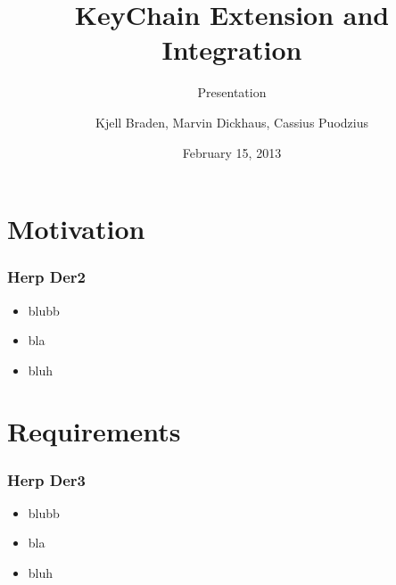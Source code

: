 \documentclass{beamer}
\title{KeyChain Extension and Integration}
\subtitle{Presentation}
\author[Braden, Dickhaus, Puodzius]{Kjell Braden, Marvin Dickhaus, Cassius Puodzius}
\institute{Fachbereich Informatik \\ TU Darmstadt}
\date{February 15, 2013}
\begin{document}
\begin{frame}
	\titlepage
\end{frame}
\begin{frame}
	\tableofcontents
\end{frame}

\section{Motivation}
	\begin{frame}
		\tableofcontents[currentsection]
	\end{frame}
	\begin{frame}
	\frametitle{Herp Der2}
	\begin{itemize}
		\item blubb
		\item bla
		\item bluh
	\end{itemize}
	\end{frame}

\section{Requirements}
	\begin{frame}
		\tableofcontents[currentsection]
	\end{frame}
	\begin{frame}
	\frametitle{Herp Der3}
		\begin{itemize}
			\item blubb
			\item bla
			\item bluh
		\end{itemize}
	\end{frame}
\end{document}
